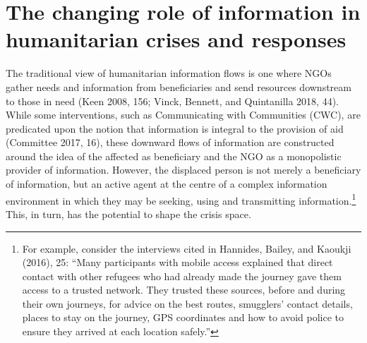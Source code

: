 \hypertarget{the-changing-role-of-information-in-humanitarian-crises-and-responses}{%
\section{The changing role of information in humanitarian crises and
responses}\label{the-changing-role-of-information-in-humanitarian-crises-and-responses}}

The traditional view of humanitarian information flows is one where NGOs
gather needs and information from beneficiaries and send resources
downstream to those in need (Keen 2008, 156; Vinck, Bennett, and
Quintanilla 2018, 44). While some interventions, such as Communicating
with Communities (CWC), are predicated upon the notion that information
is integral to the provision of aid (Committee 2017, 16), these downward
flows of information are constructed around the idea of the affected as
beneficiary and the NGO as a monopolistic provider of information.
However, the displaced person is not merely a beneficiary of
information, but an active agent at the centre of a complex information
environment in which they may be seeking, using and transmitting
information.\footnote{For example, consider the interviews cited in
  Hannides, Bailey, and Kaoukji (2016), 25: ``Many participants with
  mobile access explained that direct contact with other refugees who
  had already made the journey gave them access to a trusted network.
  They trusted these sources, before and during their own journeys, for
  advice on the best routes, smugglers' contact details, places to stay
  on the journey, GPS coordinates and how to avoid police to ensure they
  arrived at each location safely.''} This, in turn, has the potential
to shape the crisis space.

